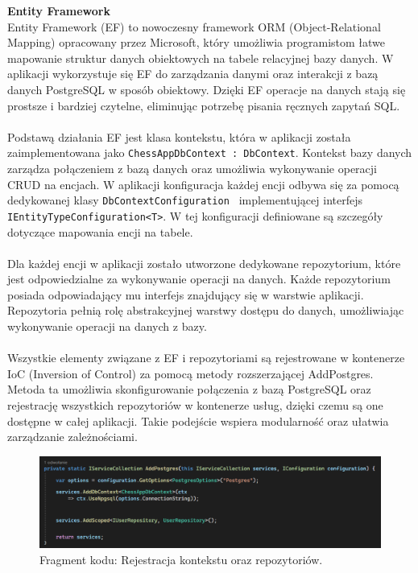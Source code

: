 \documentclass[twoside]{projektInzynierskiMS1}
\begin{document}
\newpage

\noindent \textbf{Entity Framework}\\
Entity Framework (EF) to nowoczesny framework ORM (Object-Relational Mapping) opracowany przez Microsoft, który umożliwia programistom łatwe mapowanie struktur danych obiektowych na tabele relacyjnej bazy danych. W aplikacji wykorzystuje się EF do zarządzania danymi oraz interakcji z bazą danych PostgreSQL w sposób obiektowy. Dzięki EF operacje na danych stają się prostsze i bardziej czytelne, eliminując potrzebę pisania ręcznych zapytań SQL.
\\\\
Podstawą działania EF jest klasa kontekstu, która w aplikacji została zaimplementowana jako \texttt{ChessAppDbContext : DbContext}. Kontekst bazy danych zarządza połączeniem z bazą danych oraz umożliwia wykonywanie operacji CRUD na encjach. W aplikacji konfiguracja każdej encji odbywa się za pomocą dedykowanej klasy \texttt{DbContextConfiguration } implementującej interfejs \texttt{IEntityTypeConfiguration<T>}. W tej konfiguracji definiowane są szczegóły dotyczące mapowania encji na tabele.
\\\\
Dla każdej encji w aplikacji zostało utworzone dedykowane repozytorium, które jest odpowiedzialne za wykonywanie operacji na danych. Każde repozytorium posiada odpowiadający mu interfejs znajdujący się w warstwie aplikacji. Repozytoria pełnią rolę abstrakcyjnej warstwy dostępu do danych, umożliwiając wykonywanie operacji na danych z bazy.
\\\\
Wszystkie elementy związane z EF i repozytoriami są rejestrowane w kontenerze IoC (Inversion of Control) za pomocą metody rozszerzającej AddPostgres. Metoda ta umożliwia skonfigurowanie połączenia z bazą PostgreSQL oraz rejestrację wszystkich repozytoriów w kontenerze usług, dzięki czemu są one dostępne w całej aplikacji. Takie podejście wspiera modularność oraz ułatwia zarządzanie zależnościami.

\vspace{0.5cm}
\begin{figure}[h!]
    \centering
    \includegraphics[width=1\textwidth]{images/ex_infra_extensions.png}
    \caption{Fragment kodu: Rejestracja kontekstu oraz repozytoriów.}
\end{figure}
\vspace{0.5cm}
\end{document}
